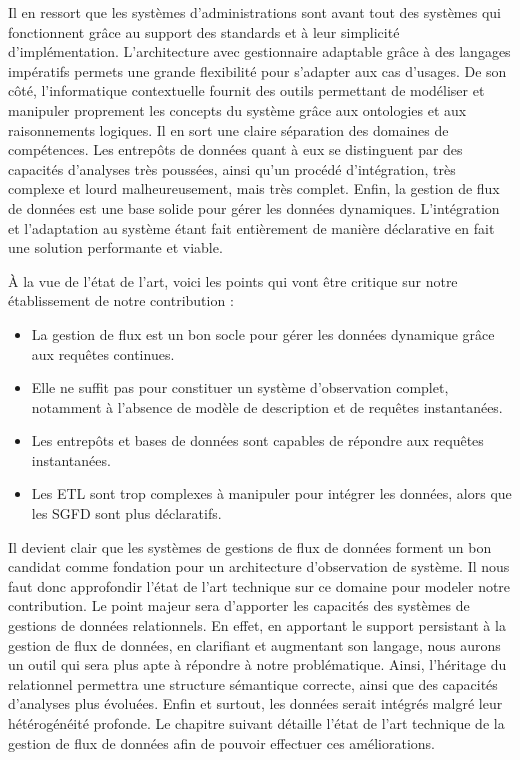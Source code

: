 Il en ressort que les systèmes d'administrations sont avant tout des systèmes qui fonctionnent grâce au support des standards et à leur simplicité d'implémentation. L'architecture avec gestionnaire adaptable grâce à des langages impératifs permets une grande flexibilité pour s'adapter aux cas d'usages. De son côté, l'informatique contextuelle fournit des outils permettant de modéliser et manipuler proprement les concepts du système grâce aux ontologies et aux raisonnements logiques. Il en sort une claire séparation des domaines de compétences. Les entrepôts de données quant à eux se distinguent par des capacités d'analyses très poussées, ainsi qu'un procédé d'intégration, très complexe et lourd malheureusement, mais très complet. Enfin, la gestion de flux de données est une base solide pour gérer les données dynamiques. L'intégration et l'adaptation au système étant fait entièrement de manière déclarative en fait une solution performante et viable.

À la vue de l'état de l'art, voici les points qui vont être critique sur notre établissement de notre contribution :
\begin{itemize}
    \item La gestion de flux est un bon socle pour gérer les données dynamique grâce aux requêtes continues.
    \item Elle ne suffit pas pour constituer un système d'observation complet, notamment à l'absence de modèle de description et de requêtes instantanées.
    \item Les entrepôts et bases de données sont capables de répondre aux requêtes instantanées.
    \item Les ETL sont trop complexes à manipuler pour intégrer les données, alors que les SGFD sont plus déclaratifs.
\end{itemize}
Il devient clair que les systèmes de gestions de flux de données forment un bon candidat comme fondation pour un architecture d'observation de système. Il nous faut donc approfondir l'état de l'art technique sur ce domaine pour modeler notre contribution. Le point majeur sera d'apporter les capacités des systèmes de gestions de données relationnels. En effet, en apportant le support persistant à la gestion de flux de données, en clarifiant et augmentant son langage, nous aurons un outil qui sera plus apte à répondre à notre problématique. Ainsi, l'héritage du relationnel permettra une structure sémantique correcte, ainsi que des capacités d'analyses plus évoluées. Enfin et surtout, les données serait intégrés malgré leur hétérogénéité profonde. Le chapitre suivant détaille l'état de l'art technique de la gestion de flux de données afin de pouvoir effectuer ces améliorations.